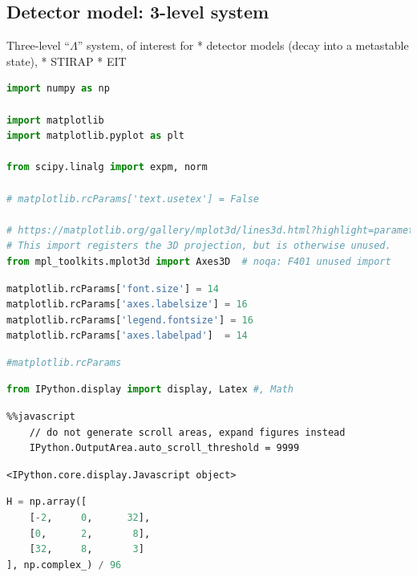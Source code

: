 \hypertarget{detector-model-3-level-system}{%
\subsection{Detector model: 3-level
system}\label{detector-model-3-level-system}}

Three-level ``\(\Lambda\)'' system, of interest for * detector models
(decay into a metastable state), * STIRAP * EIT

\begin{lstlisting}[language=Python]
import numpy as np

import matplotlib
import matplotlib.pyplot as plt

from scipy.linalg import expm, norm

# matplotlib.rcParams['text.usetex'] = False

# https://matplotlib.org/gallery/mplot3d/lines3d.html?highlight=parametric
# This import registers the 3D projection, but is otherwise unused.
from mpl_toolkits.mplot3d import Axes3D  # noqa: F401 unused import
\end{lstlisting}

\begin{lstlisting}[language=Python]
matplotlib.rcParams['font.size'] = 14
matplotlib.rcParams['axes.labelsize'] = 16
matplotlib.rcParams['legend.fontsize'] = 16
matplotlib.rcParams['axes.labelpad']  = 14
\end{lstlisting}

\begin{lstlisting}[language=Python]
#matplotlib.rcParams
\end{lstlisting}

\begin{lstlisting}[language=Python]
from IPython.display import display, Latex #, Math
\end{lstlisting}

\begin{lstlisting}
%%javascript
    // do not generate scroll areas, expand figures instead
    IPython.OutputArea.auto_scroll_threshold = 9999
\end{lstlisting}

\begin{lstlisting}
<IPython.core.display.Javascript object>
\end{lstlisting}

\begin{lstlisting}[language=Python]
H = np.array([
    [-2,     0,      32],
    [0,      2,       8],
    [32,     8,       3]
], np.complex_) / 96
\end{lstlisting}

